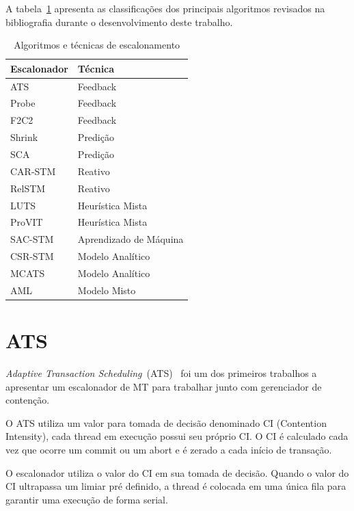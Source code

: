 \documentclass[diss,capa]{texufpel}
\begin{document}

A tabela~\ref{tab:compare} apresenta as classificações dos principais algoritmos revisados na bibliografia durante o desenvolvimento deste trabalho.

\begin{table}[]
\footnotesize
\centering
\caption{Algoritmos e técnicas de escalonamento}
\label{tab:compare}
\begin{tabular}{l|l}
\hline
Escalonador & Técnica \\ \hline
ATS & Feedback \\
Probe & Feedback \\
F2C2 & Feedback \\
Shrink & Predição \\
SCA & Predição \\
CAR-STM & Reativo \\
RelSTM & Reativo \\
LUTS & Heurística Mista \\
ProVIT & Heurística Mista \\
SAC-STM & Aprendizado de Máquina \\
CSR-STM & Modelo Analítico \\
MCATS & Modelo Analítico \\
AML & Modelo Misto \\
\hline
\end{tabular}
\end{table}

\section{ATS}

\emph{Adaptive Transaction Scheduling}~(ATS)~\cite{ats2008} foi um dos primeiros trabalhos a apresentar um escalonador de MT para trabalhar junto com gerenciador de contenção.

O ATS utiliza um valor para tomada de decisão denominado CI (Contention Intensity), cada thread em execução possui seu próprio CI. O CI é calculado cada vez que ocorre um commit ou um abort e é zerado a cada início de transação.

O escalonador utiliza o valor do CI em sua tomada de decisão. Quando o valor do CI ultrapassa um limiar pré definido, a thread é colocada em uma única fila para garantir uma execução de forma serial.
\end{document}
